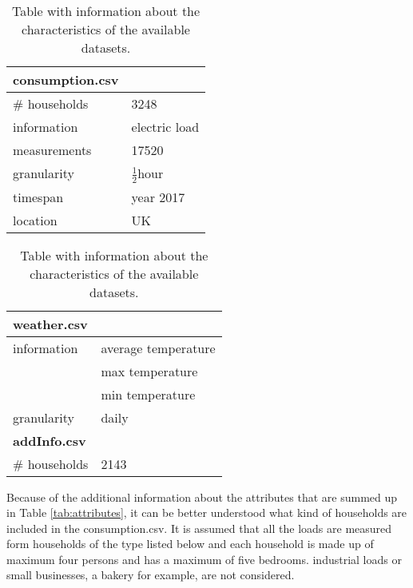 
\begin{table}
	\footnotesize
	\hspace{1cm}
	\begin{tabular}[t]{@{}ll}\hline
		\textbf{consumption.csv}&\\ \hline
		\# households &3248 \\ 
		information & electric load\\
		measurements & 17520\\
		granularity&$ \frac{1}{2} $hour\\ 
		timespan&year 2017 \\    
		location&UK\\ \bottomrule   
	\end{tabular}
	\hspace{2cm}
	\begin{tabular}[t]{@{}ll}\hline
		\textbf{weather.csv}&\\ \hline
		information & average temperature\\
		& max temperature\\
		& min temperature\\
		granularity& daily\\ \hline \hline
		\textbf{addInfo.csv}&\\ \hline
		\# households &2143 \\ \bottomrule		    
	\end{tabular}
	\hfill
	\caption{Table with information about the characteristics of the available datasets.}
	\label{tab:available_data}
\end{table}

Because of the additional information about the attributes that are summed up in Table \ref{tab:attributes}, it can be better understood what kind of households are included in the consumption.csv. It is assumed that all the loads are measured form households of the type listed below and each household is made up of maximum four persons and has a maximum of five bedrooms. industrial loads or small businesses, a bakery for example, are not considered.

